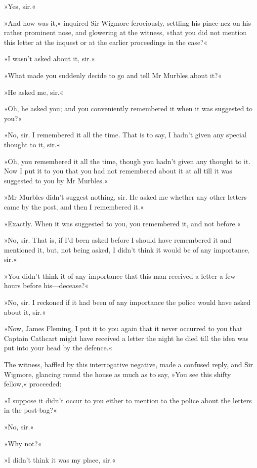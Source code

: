 »Yes, sir.«

»And how was it,« inquired Sir Wigmore ferociously, settling his pince-nez on his rather prominent nose, and glowering at the witness, »that you did not mention this letter at the inquest or at the earlier proceedings in the case?«

»I wasn't asked about it, sir.«

»What made you suddenly decide to go and tell Mr Murbles about it?«

»He asked me, sir.«

»Oh, he asked you; and you conveniently remembered it when it was suggested to you?«

»No, sir. I remembered it all the time. That is to say, I hadn't given any special thought to it, sir.«

»Oh, you remembered it all the time, though you hadn't given any thought to it. Now I put it to you that you had not remembered about it at all till it was suggested to you by Mr Murbles.«

»Mr Murbles didn't suggest nothing, sir. He asked me whether any other letters came by the post, and then I remembered it.«

»Exactly. When it was suggested to you, you remembered it, and not before.«

»No, sir. That is, if I'd been asked before I should have remembered it and mentioned it, but, not being asked, I didn't think it would be of any importance, sir.«

»You didn't think it of any importance that this man received a letter a few hours before his\allowbreak---\allowbreak decease?«

»No, sir. I reckoned if it had been of any importance the police would have asked about it, sir.«

»Now, James Fleming, I put it to you again that it never occurred to you that Captain Cathcart might have received a letter the night he died till the idea was put into your head by the defence.«

The witness, baffled by this interrogative negative, made a confused reply, and Sir Wigmore, glancing round the house as much as to say, »You see this shifty fellow,« proceeded:

»I suppose it didn't occur to you either to mention to the police about the letters in the post-bag?«

»No, sir.«

»Why not?«

»I didn't think it was my place, sir.«

